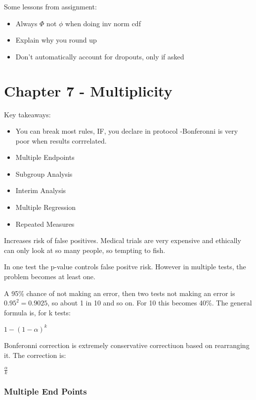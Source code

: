 \documentclass[
  letterpaper,
  DIV=11,
  numbers=noendperiod]{scrreprt}
\providecommand{\tightlist}{%
  \setlength{\itemsep}{0pt}\setlength{\parskip}{0pt}}\usepackage{longtable,booktabs,array}
\begin{document}
Some lessons from assignment:

\begin{itemize}
\tightlist
\item
  Always \(\Phi\) not \(\phi\) when doing inv norm cdf
\item
  Explain why you round up
\item
  Don't automatically account for dropouts, only if asked
\end{itemize}

\hypertarget{chapter-7---multiplicity}{%
\section{Chapter 7 - Multiplicity}\label{chapter-7---multiplicity}}

Key takeaways:

\begin{itemize}
\item
  You can break most rules, IF, you declare in protocol -Bonferonni is
  very poor when results corrrelated.
\item
  Multiple Endpoints
\item
  Subgroup Analysis
\item
  Interim Analysis
\item
  Multiple Regression
\item
  Repeated Measures
\end{itemize}

Increases risk of false positives. Medical trials are very expensive and
ethically can only look at so many people, so tempting to fish.

In one test the p-value controls false positve risk. However in multiple
tests, the problem becomes at least one.

A 95\% chance of not making an error, then two tests not making an error
is \(0.95^2 = 0.9025\), so about 1 in 10 and so on. For 10 this becomes
40\%. The general formula is, for k tests:

\(1-(1-\alpha)^k\)

Bonferonni correction is extremely conservative correctiuon based on
rearranging it. The correction is:

\(\frac{\alpha}{k}\)

\hypertarget{multiple-end-points}{%
\subsubsection{Multiple End Points}\label{multiple-end-points}}
\end{document}
